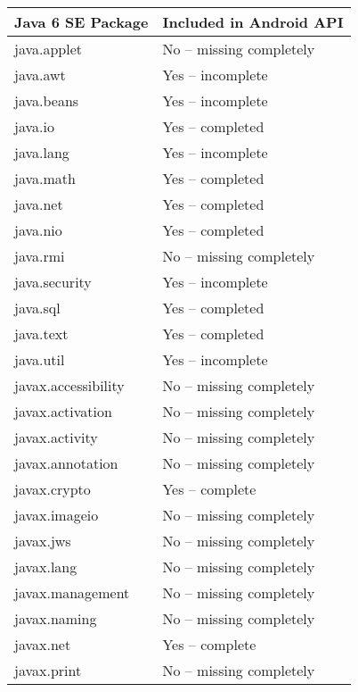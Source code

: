 \begin {table}[h!]
\begin{tabular}{|l|l|}
\hline
{\bf Java 6 SE Package} & {\bf Included in Android API} \\
\hline \hline
java.applet             & No -- missing completely    \\
java.awt                & Yes -- incomplete            \\
java.beans              & Yes -- incomplete            \\
java.io	                & Yes -- completed             \\
java.lang	            & Yes -- incomplete            \\
java.math	            & Yes -- completed             \\
java.net	            & Yes -- completed             \\
java.nio	            & Yes -- completed             \\
java.rmi	            & No  -- missing completely    \\
java.security	        & Yes -- incomplete            \\
java.sql	            & Yes -- completed             \\
java.text	            & Yes -- completed             \\
java.util	            & Yes -- incomplete            \\
javax.accessibility     & No -- missing completely    \\
javax.activation	    & No -- missing completely    \\
javax.activity	        & No -- missing completely    \\
javax.annotation	    & No -- missing completely    \\
javax.crypto	        & Yes -- complete              \\
javax.imageio	        & No -- missing completely    \\
javax.jws	            & No -- missing completely    \\
javax.lang	            & No -- missing completely    \\
javax.management        & No -- missing completely    \\
javax.naming	        & No -- missing completely    \\
javax.net	            & Yes -- complete              \\
javax.print		        & No -- missing completely    \\

\end{tabular}
\end{table}
